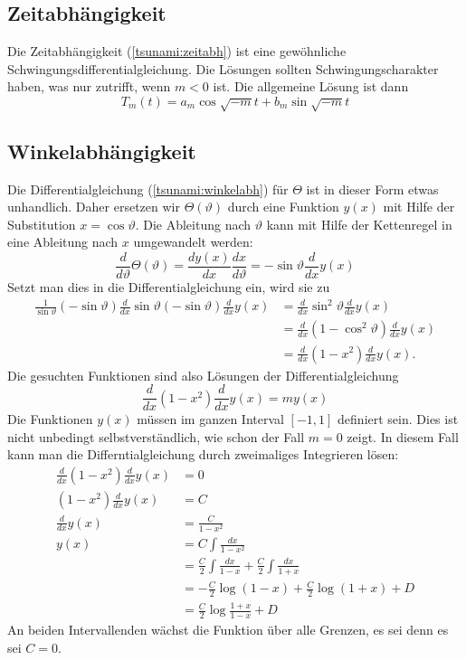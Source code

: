 \subsection{Zeitabhängigkeit}
Die Zeitabhängigkeit (\ref{tsunami:zeitabh}) ist eine gewöhnliche
Schwingungsdifferentialgleichung.
Die Lösungen sollten Schwingungscharakter haben, was nur zutrifft, wenn
$m<0$ ist. Die allgemeine Lösung ist dann
\[
T_m(t)=a_m\cos\sqrt{-m}t+b_m\sin\sqrt{-m}t
\]

\subsection{Winkelabhängigkeit}
Die Differentialgleichung (\ref{tsunami:winkelabh}) für $\Theta$
ist in dieser Form etwas unhandlich.
Daher ersetzen wir $\Theta(\vartheta)$ durch eine
Funktion $y(x)$ mit Hilfe der Substitution $x=\cos\vartheta$.
Die Ableitung nach $\vartheta$ kann mit Hilfe der Kettenregel
in eine Ableitung nach $x$ umgewandelt werden:
\[
\frac{d}{d\vartheta}\Theta(\vartheta)
=\frac{dy(x)}{dx}\frac{dx}{d\vartheta}
=-\sin\vartheta \frac{d}{dx} y(x)
\]
Setzt man dies in die Differentialgleichung ein, wird sie zu
\begin{align*}
\frac1{\sin\vartheta}
(-\sin{\vartheta})\frac{d}{dx}\sin\vartheta (-\sin\vartheta)
\frac{d}{dx}y(x)
&=
\frac{d}{dx}\sin^2\vartheta\frac{d}{dx}y(x)\\
&=
\frac{d}{dx}(1-\cos^2\vartheta)\frac{d}{dx}y(x)\\
&=
\frac{d}{dx}(1-x^2)\frac{d}{dx}y(x).
\end{align*}
Die gesuchten Funktionen sind also Lösungen der Differentialgleichung
\begin{equation}
\frac{d}{dx}(1-x^2)\frac{d}{dx}y(x)
=
my(x)
\label{tsunamieigenwertproblem}
\end{equation}
Die Funktionen $y(x)$ müssen im ganzen Interval $[-1,1]$ definiert
sein. Dies ist nicht unbedingt selbstverständlich, wie schon der Fall
$m=0$ zeigt. In diesem Fall kann man die Differntialgleichung
durch zweimaliges Integrieren lösen:
\begin{align*}
\frac{d}{dx}(1-x^2)\frac{d}{dx}y(x)&=0\\
(1-x^2)\frac{d}{dx}y(x)&=C\\
\frac{d}{dx}y(x)&=\frac{C}{1-x^2}\\
y(x)&=C\int\frac{dx}{1-x^2}\\
&=\frac{C}2\int\frac{dx}{1-x}+\frac{C}2\int\frac{dx}{1+x}\\
&=-\frac{C}2\log(1-x)+\frac{C}2\log(1+x) +D\\
&=\frac{C}2\log\frac{1+x}{1-x} + D
\end{align*}
An beiden Intervallenden wächst die Funktion über alle Grenzen,
es sei denn es sei $C=0$.

